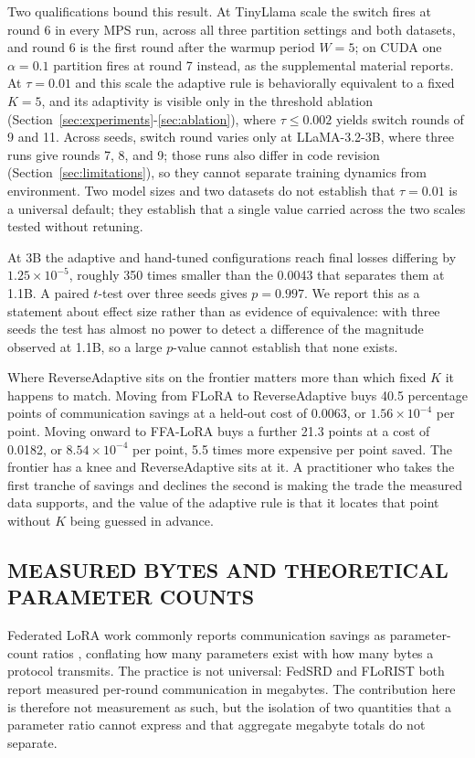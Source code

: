 Two qualifications bound this result. At TinyLlama scale the switch fires at round 6 in every MPS run, across all three partition settings and both datasets, and round 6 is the first round after the warmup period $W{=}5$; on CUDA one $\alpha{=}0.1$ partition fires at round 7 instead, as the supplemental material reports. At $\tau{=}0.01$ and this scale the adaptive rule is behaviorally equivalent to a fixed $K{=}5$, and its adaptivity is visible only in the threshold ablation (Section~\ref{sec:experiments}-\ref{sec:ablation}), where $\tau \leq 0.002$ yields switch rounds of 9 and 11. Across seeds, switch round varies only at LLaMA-3.2-3B, where three runs give rounds 7, 8, and 9; those runs also differ in code revision (Section~\ref{sec:limitations}), so they cannot separate training dynamics from environment. Two model sizes and two datasets do not establish that $\tau{=}0.01$ is a universal default; they establish that a single value carried across the two scales tested without retuning.

At 3B the adaptive and hand-tuned configurations reach final losses differing by $1.25 \times 10^{-5}$, roughly 350 times smaller than the 0.0043 that separates them at 1.1B. A paired $t$-test over three seeds gives $p = 0.997$. We report this as a statement about effect size rather than as evidence of equivalence: with three seeds the test has almost no power to detect a difference of the magnitude observed at 1.1B, so a large $p$-value cannot establish that none exists.

Where ReverseAdaptive sits on the frontier matters more than which fixed $K$ it happens to match. Moving from FLoRA to ReverseAdaptive buys 40.5 percentage points of communication savings at a held-out cost of 0.0063, or $1.56 \times 10^{-4}$ per point. Moving onward to FFA-LoRA buys a further 21.3 points at a cost of 0.0182, or $8.54 \times 10^{-4}$ per point, 5.5 times more expensive per point saved. The frontier has a knee and ReverseAdaptive sits at it. A practitioner who takes the first tranche of savings and declines the second is making the trade the measured data supports, and the value of the adaptive rule is that it locates that point without $K$ being guessed in advance.

\subsection{MEASURED BYTES AND THEORETICAL PARAMETER COUNTS}
Federated LoRA work commonly reports communication savings as parameter-count ratios \cite{zhang2024federatedgpt,sun2024ffalora,wang2024flora,bai2024flexlora}, conflating how many parameters exist with how many bytes a protocol transmits. The practice is not universal: FedSRD \cite{yan2026fedsrd} and FLoRIST \cite{ramesh2026florist} both report measured per-round communication in megabytes. The contribution here is therefore not measurement as such, but the isolation of two quantities that a parameter ratio cannot express and that aggregate megabyte totals do not separate.

